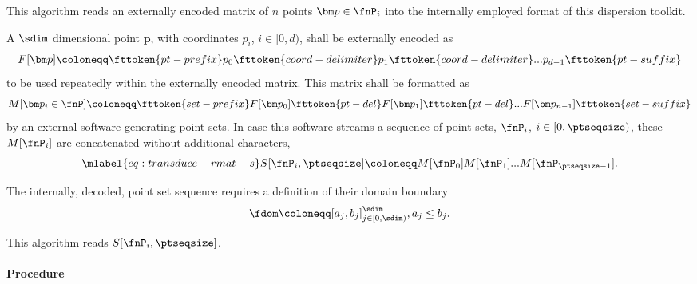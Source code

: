 %
This algorithm reads an externally encoded matrix of $n$ points $\bm p \in \fnP_i$ into the internally employed format of this dispersion toolkit.

A $\sdim$ dimensional point $\bm p$, with coordinates $p_i$, $i \in [0,d)$, shall be externally encoded as
\begin{align*}
  F[\bm p] \coloneqq \fttoken{pt-prefix}p_0\fttoken{coord-delimiter}p_1\fttoken{coord-delimiter}...p_{d-1}\fttoken{pt-suffix}
\end{align*}
to be used repeatedly within the externally encoded matrix. This matrix shall be formatted as
\begin{align*}
  M[\bm p_i \in \fnP] \coloneqq \fttoken{set-prefix}F[\bm p_0]\fttoken{pt-del}F[\bm p_1]\fttoken{pt-del}...F[\bm p_{n-1}]\fttoken{set-suffix}
\end{align*}
by an external software generating point sets. In case this software streams a sequence of point sets, $\fnP_i$, $i \in [0,\ptseqsize)$, these $M[\fnP_i]$ are concatenated without additional characters,
\begin{align}\mlabel{eq:transduce-rmat-s}
  S[\fnP_i, \ptseqsize] \coloneqq M[\fnP_0]M[\fnP_1]...M[\fnP_{\ptseqsize-1}].
\end{align}

The internally, decoded, point set sequence requires a definition of their domain boundary
\begin{align*}
  \fdom \coloneqq [a_j, b_j]^{\sdim}_{j \in [0,\sdim)}, a_j \leq b_j.
\end{align*}

This algorithm reads $S[\fnP_i, \ptseqsize]$.

\paragraph{Procedure}

